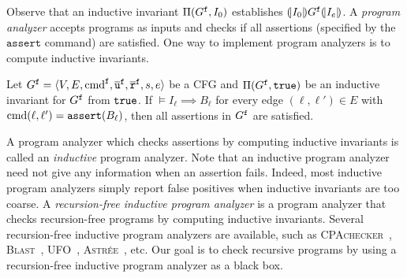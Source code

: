 Observe that an inductive invariant $\Pi (G^{\mathtt{{f}}}, I_0)$ establishes
$(\!| {I_0} |\!) G^{\mathtt{{f}}} (\!| {I_{e}} |\!)$.
A \emph{program analyzer} accepts programs as inputs and checks if all
assertions (specified by the $\mathtt{assert}$ command) are satisfied.
One way to implement program analyzers is to compute inductive invariants.
\begin{proposition}
Let $G^{\mathtt{{f}}} = \langle V, E,\textup{\textmd{{cmd}}}^{\mathtt{{f}}},
\overline{\mathtt{u}}^{\mathtt{{f}}}, \overline{\mathtt{r}}^{\mathtt{{f}}}, s, e \rangle$
be a CFG and $\Pi (G^{\mathtt{{f}}}, \mathtt{true})$ be an inductive invariant for
$G^{\mathtt{{f}}}$ from $\mathtt{true}$.
If $\models I_{\ell} \implies B_{\ell}$ for every edge $(\ell, \ell') \in E$
with $\textup{\textmd{{cmd}}} (\ell, \ell') = \mathtt{assert} (B_{\ell})$,
then all assertions in $G^{\mathtt{{f}}}$ are satisfied.
\label{proposition:inductive-invariant}
\end{proposition}
A program analyzer which checks assertions by computing inductive invariants is
called an \emph{inductive} program analyzer.
Note that an inductive program analyzer need not give any information when an
assertion fails.
Indeed, most inductive program analyzers simply report false positives when
inductive invariants are too coarse.
A \emph{recursion-free inductive program analyzer} is a program analyzer that
checks recursion-free programs by computing inductive invariants.
Several recursion-free inductive program analyzers are available, such as
\textsc{CPAchecker}~\cite{BeyerK11}, \textsc{Blast}~\cite{BeyerHJM07},
\textsc{UFO}~\cite{AlbarghouthiLGC12}, \textsc{Astr\'ee}~\cite{CousotCFMMMR05},
etc.
Our goal is to check recursive programs by using a recursion-free inductive
program analyzer as a black box.
